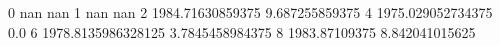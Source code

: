 0 nan nan
1 nan nan
2 1984.71630859375 9.687255859375
4 1975.029052734375 0.0
6 1978.8135986328125 3.7845458984375
8 1983.87109375 8.842041015625
